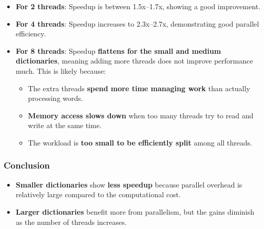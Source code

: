 \documentclass[a4paper,11pt]{article}
\begin{document}
\begin{itemize}
    \item \textbf{For 2 threads}: Speedup is between 1.5x–1.7x, showing a good improvement.  
    \item \textbf{For 4 threads}: Speedup increases to 2.3x–2.7x, demonstrating good parallel efficiency.  
    \item \textbf{For 8 threads}: Speedup \textbf{flattens for the small and medium dictionaries}, meaning adding more threads does not improve performance much. This is likely because:
    \begin{itemize}
        \item The extra threads \textbf{spend more time managing work} than actually processing words.
        \item \textbf{Memory access slows down} when too many threads try to read and write at the same time.
        \item The workload is \textbf{too small to be efficiently split} among all threads.
    \end{itemize}

\end{itemize}

\subsubsection*{Conclusion}

\begin{itemize}
    \item \textbf{Smaller dictionaries} show \textbf{less speedup} because parallel overhead is relatively large compared to the computational cost.  
    \item \textbf{Larger dictionaries} benefit more from parallelism, but the gains diminish as the number of threads increases.  
\end{itemize}
\end{document}
